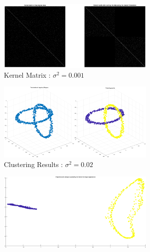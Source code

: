 \begin{figure}[ht]
	\begin{subfigure}[b]{0.32\textwidth}
		\centering
		\includegraphics[height= 0.55\textwidth, width = 0.85\textwidth]{Exercise3/Report/sclust_sig_0.001_2}
		\caption{Kernel Matrix : $\sigma^2 = 0.001$}\label{fig:sclust_sig_0.001_2}
	\end{subfigure}
	\begin{subfigure}[b]{0.32\textwidth}
		\centering
		\includegraphics[height= 0.55\textwidth, width = 0.85\textwidth]{Exercise3/Report/sclust_sig_0.02.eps}
		\caption{Clustering Results : $\sigma^2 = 0.02$}\label{fig:sclust_sig_0.02}
	\end{subfigure}%
	\begin{subfigure}[b]{0.32\textwidth}
		\centering
		\includegraphics[height= 0.55\textwidth, width = 0.85\textwidth]{Exercise3/Report/sclust_sig_0.02_1}

\end{subfigure}
\end{figure}
